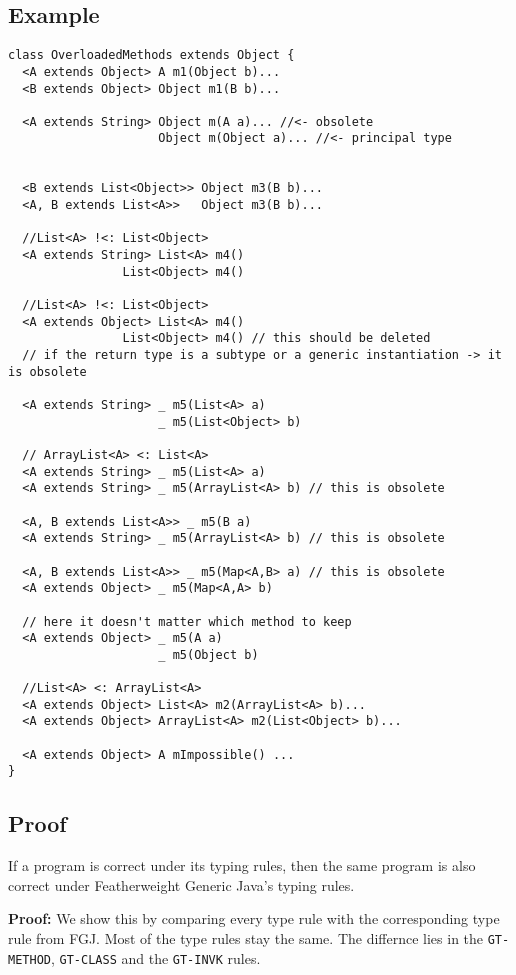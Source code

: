 \documentclass[a4paper,USenglish,cleveref, autoref, thm-restate]{lipics-v2021}
\begin{document}
\subsection{Example}

\begin{lstlisting}
class OverloadedMethods extends Object {
  <A extends Object> A m1(Object b)... 
  <B extends Object> Object m1(B b)...

  <A extends String> Object m(A a)... //<- obsolete
                     Object m(Object a)... //<- principal type


  <B extends List<Object>> Object m3(B b)...
  <A, B extends List<A>>   Object m3(B b)...

  //List<A> !<: List<Object>
  <A extends String> List<A> m4()
                List<Object> m4() 

  //List<A> !<: List<Object>
  <A extends Object> List<A> m4()
                List<Object> m4() // this should be deleted 
  // if the return type is a subtype or a generic instantiation -> it is obsolete

  <A extends String> _ m5(List<A> a)
                     _ m5(List<Object> b)

  // ArrayList<A> <: List<A>
  <A extends String> _ m5(List<A> a)
  <A extends String> _ m5(ArrayList<A> b) // this is obsolete

  <A, B extends List<A>> _ m5(B a)
  <A extends String> _ m5(ArrayList<A> b) // this is obsolete

  <A, B extends List<A>> _ m5(Map<A,B> a) // this is obsolete
  <A extends Object> _ m5(Map<A,A> b) 
                                      
  // here it doesn't matter which method to keep
  <A extends Object> _ m5(A a)
                     _ m5(Object b)

  //List<A> <: ArrayList<A>
  <A extends Object> List<A> m2(ArrayList<A> b)...
  <A extends Object> ArrayList<A> m2(List<Object> b)...

  <A extends Object> A mImpossible() ...
}
\end{lstlisting}




\subsection{Proof}
\begin{theoremAndi}
  If a \TFGJ program is correct under its typing rules,
  then the same program is also correct under Featherweight Generic Java's typing rules.
\end{theoremAndi}
\textbf{Proof:}
We show this by comparing every \TFGJ type rule with the corresponding type rule from FGJ.
Most of the type rules stay the same.
The differnce lies in the \texttt{GT-METHOD}, \texttt{GT-CLASS}
and the \texttt{GT-INVK} rules.
\end{document}
